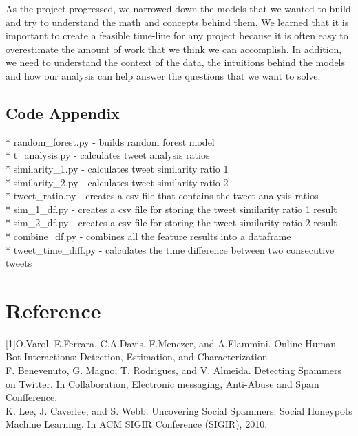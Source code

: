 \documentclass[a4paper, twoside, 12pt]{report}
\begin{document}
\noindent As the project progressed, we narrowed down the models that we wanted to build and try to understand the math and concepts behind them, We learned that it is important to create a feasible time-line for any project because it is often easy to overestimate the amount of work that we think we can accomplish. In addition, we need to understand the context of the data, the intuitions behind the models and how our analysis can help answer the questions that we want to solve.\\
\subsection{Code Appendix}
* random\_forest.py - builds random forest model\\
* t\_analysis.py - calculates tweet analysis ratios\\
* similarity\_1.py - calculates tweet similarity ratio 1\\
* similarity\_2.py - calculates tweet similarity ratio 2\\
* tweet\_ratio.py - creates a csv file that contains the tweet analysis ratios\\
* sim\_1\_df.py - creates a csv file for storing the tweet similarity ratio 1 result\\
* sim\_2\_df.py - creates a csv file for storing the tweet similarity ratio 2 result\\
* combine\_df.py - combines all the feature results into a dataframe\\
* tweet\_time\_diff.py - calculates the time difference between two consecutive tweets\\

\section{Reference}
[1]O.Varol, E.Ferrara, C.A.Davis, F.Menczer, and A.Flammini. Online Human-Bot Interactions: Detection, Estimation, and Characterization\\

\noindent [2] F. Benevenuto, G. Magno, T. Rodrigues, and V. Almeida. Detecting Spammers on Twitter. In Collaboration, Electronic messaging, Anti-Abuse and Spam Confference.\\

\noindent [3] K. Lee, J. Caverlee, and S. Webb. Uncovering Social Spammers: Social Honeypots Machine Learning. In ACM SIGIR Conference (SIGIR), 2010.\\
\end{document}
